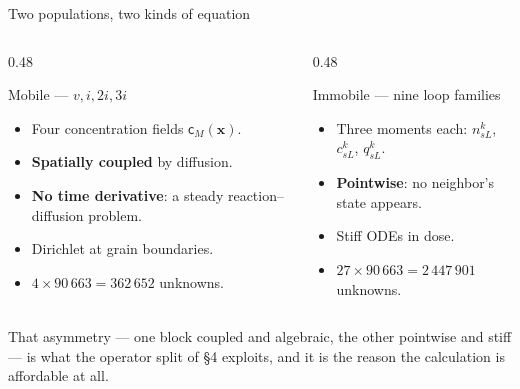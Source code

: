 \documentclass[aspectratio=169,10pt]{beamer}
\newcommand{\spvec}[1]{\bm{\mathsf{#1}}}
\newcommand{\xv}{\bm{x}}
\newcommand{\foot}[1]{\par\vspace{1ex}%
  \begingroup\footnotesize\raggedright #1\par\endgroup}
\begin{document}
\begin{frame}{Two populations, two kinds of equation}
\begin{columns}[T]
\begin{column}{0.48\textwidth}
\begin{block}{Mobile --- $v,i,2i,3i$}
\begin{itemize}\small
  \item Four concentration fields $\spvec c_M(\xv)$.
  \item \textbf{Spatially coupled} by diffusion.
  \item \textbf{No time derivative}: a steady reaction--diffusion problem.
  \item Dirichlet at grain boundaries.
  \item $4\times90\,663=362\,652$ unknowns.
\end{itemize}
\end{block}
\end{column}
\begin{column}{0.48\textwidth}
\begin{block}{Immobile --- nine loop families}
\begin{itemize}\small
  \item Three moments each: $n^k_{sL}$, $c^k_{sL}$, $q^k_{sL}$.
  \item \textbf{Pointwise}: no neighbor's state appears.
  \item Stiff ODEs in dose.
  \item $27\times90\,663=2\,447\,901$ unknowns.
\end{itemize}
\end{block}
\end{column}
\end{columns}
\foot{That asymmetry --- one block coupled and algebraic, the other pointwise
and stiff --- is what the operator split of \S4 exploits, and it is the reason
the calculation is affordable at all.}
\end{frame}
\end{document}
